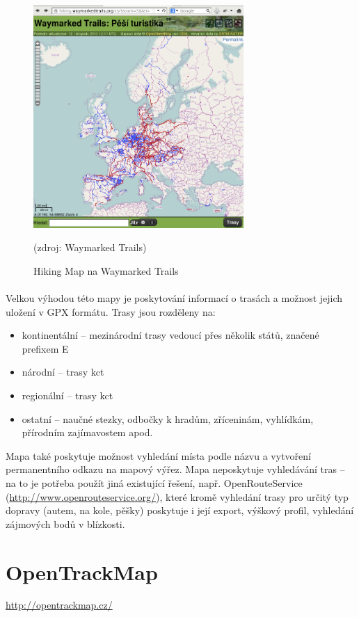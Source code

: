 \documentclass[11pt,a4paper,titlepage,oneside]{book}
\begin{document}
		\begin{figure}[!h]
			\begin{center}
				\includegraphics[width=8cm]{obrazky/waymarkedTrails.png}
				\caption{Hiking Map na Waymarked Trails}
				(zdroj: Waymarked Trails\cite{Waymarked})
			\end{center}
		\end{figure}
	
		\paragraph{} Velkou výhodou této mapy je poskytování informací o trasách a možnost jejich uložení v \ac{GPX} formátu. Trasy jsou rozděleny na:
	\begin{itemize}
		 \item kontinentální -- mezinárodní trasy vedoucí přes několik států, značené prefixem E
		 \item národní -- trasy \ac{kct}
		 \item regionální -- trasy \ac{kct}
     		 \item ostatní -- naučné stezky, odbočky k hradům, zříceninám, vyhlídkám, přírodním zajímavostem apod.
	\end{itemize}
  Mapa také poskytuje možnost vyhledání místa podle názvu a vytvoření permanentního odkazu na mapový výřez. Mapa neposkytuje vyhledávání tras -- na to je potřeba použít jiná existující řešení, např. OpenRouteService (\url{http://www.openrouteservice.org/}), které kromě vyhledání trasy pro určitý typ dopravy (autem, na kole, pěšky) poskytuje i její export, výškový profil, vyhledání zájmových bodů v blízkosti.

 	\section{OpenTrackMap}
		\url{http://opentrackmap.cz/}
\end{document}
